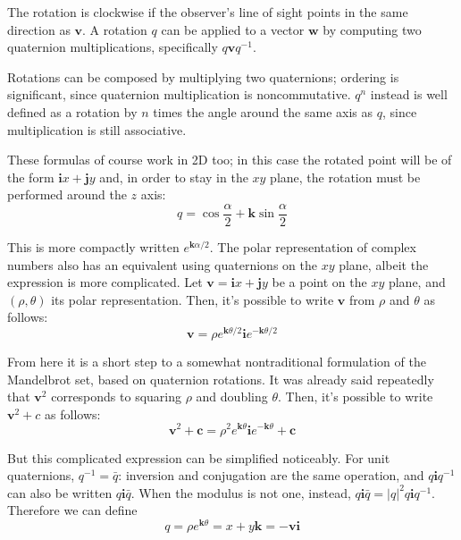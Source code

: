 \documentclass{article}
\let\vec\mathbf
\begin{document}
The rotation is clockwise if the observer's line of sight points in the
same direction as $\vec{v}$.  A rotation $q$ can be applied to a vector
$\vec{w}$ by computing two quaternion multiplications, specifically
$q\vec{v}q^{-1}$.

Rotations can be composed by multiplying two quaternions; ordering is
significant, since quaternion multiplication is noncommutative.  $q^n$
instead is well defined as a rotation by $n$ times the angle around the
same axis as $q$, since multiplication is still associative.

These formulas of course work in 2D too; in this case the rotated
point will be of the form $\vec{i}x+\vec{j}y$ and, in order to stay in
the $xy$ plane, the rotation must be performed around the $z$ axis:
\begin{equation*}
q = \cos \frac\alpha2 + \vec{k} \sin \frac\alpha2
\end{equation*}

\noindent
This is more compactly written $e^{\vec{k}\alpha/2}$.  The polar
representation of complex numbers also has an equivalent using
quaternions on the $xy$ plane, albeit the expression is more
complicated.  Let $\vec{v}=\vec{i}x+\vec{j}y$ be a point on the $xy$
plane, and $(\rho,\theta)$ its polar representation.  Then, it's
possible to write $\vec{v}$ from $\rho$ and $\theta$ as follows:
\begin{equation*}
\vec{v}=\rho e^{\vec{k}\theta/2} \vec{i} e^{-\vec{k}\theta/2}
\end{equation*}

From here it is a short step to a somewhat nontraditional formulation of
the Mandelbrot set, based on quaternion rotations.  It was already said
repeatedly that $\vec{v}^2$ corresponds to squaring $\rho$ and doubling
$\theta$.  Then, it's possible to write $\vec{v}^2+c$ as follows:
\begin{equation*}
\vec{v}^2+\vec{c}=\rho^2 e^{\vec{k}\theta} \vec{i} e^{-\vec{k}\theta}+\vec{c}
\end{equation*}

But this complicated expression can be simplified noticeably.  For unit
quaternions, $q^{-1}=\bar q$: inversion and conjugation are the same
operation, and $q\vec{i}q^{-1}$ can also be written $q\vec{i}\bar
q$.  When the modulus is not one, instead, $q\vec{i}\bar q = |q|^2
q\vec{i}q^{-1}$.  Therefore we can define
\begin{equation*}
q = \rho e^{\vec{k}\theta} = x + y\vec{k} = -\vec{v}\vec{i}
\end{equation*}
\end{document}
